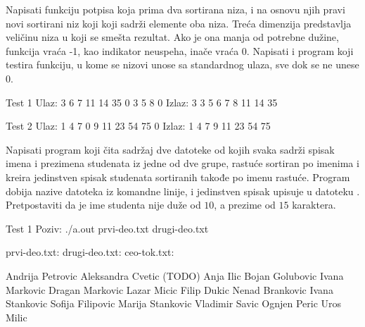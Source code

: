 \begin{Exercise}[label=505]
  Napisati funkciju potpisa  koja prima dva sortirana
  niza, i na osnovu njih pravi novi sortirani niz koji koji sadrži
  elemente oba niza. Treća dimenzija predstavlja veličinu niza u koji
  se smešta rezultat. Ako je ona manja od potrebne dužine, funkcija
  vraća -1, kao indikator neuspeha, inače vraća 0. Napisati i program
  koji testira funkciju, u kome se nizovi unose sa standardnog ulaza,
  sve dok se ne unese 0.
\begin{miditest}
\begin{test}{Test 1}
Ulaz:   3 6 7 11 14 35 0 3 5 8 0
Izlaz:  3 3 5 6 7 8 11 14 35
\end{test}
\end{miditest}

\begin{miditest}
\begin{test}{Test 2}
Ulaz:   1 4 7 0 9 11 23 54 75 0
Izlaz:  1 4 7 9 11 23 54 75
\end{test}
\end{miditest}
  
\end{Exercise}

\begin{Exercise}[label=506]
  Napisati program koji čita sadržaj dve datoteke od kojih svaka
  sadrži spisak imena i prezimena studenata iz jedne od dve grupe,
  rastuće sortiran po imenima i kreira jedinstven spisak studenata
  sortiranih takođe po imenu rastuće.  Program dobija nazive datoteka
  iz komandne linije, i jedinstven spisak upisuje u datoteku
  . Pretpostaviti da je ime studenta nije duže od
  $10$, a prezime od $15$ karaktera.


\begin{maxitest}
\begin{test}{Test 1}
Poziv: ./a.out prvi-deo.txt drugi-deo.txt

prvi-deo.txt:          drugi-deo.txt:         ceo-tok.txt:

Andrija Petrovic       Aleksandra Cvetic      (TODO)
Anja Ilic              Bojan Golubovic
Ivana Markovic         Dragan Markovic
Lazar Micic            Filip Dukic
Nenad Brankovic        Ivana Stankovic
Sofija Filipovic       Marija Stankovic
Vladimir Savic         Ognjen Peric
                       Uros Milic
\end{test}
\end{maxitest}
  
\end{Exercise}

